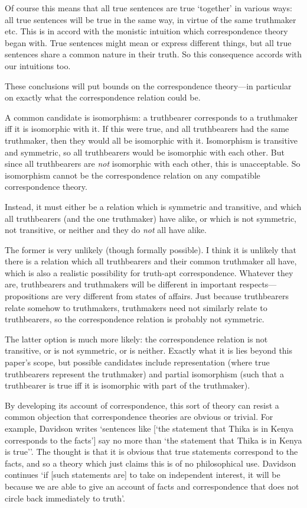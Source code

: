 Of course this means that all true sentences are true `together' in various ways: all true sentences will be true in the same way, in virtue of the same truthmaker etc.
This is in accord with the monistic intuition which correspondence theory began with.
True sentences might mean or express different things, but all true sentences share a common nature in their truth.
So this consequence accords with our intuitions too.

These conclusions will put bounds on the correspondence theory---in particular on exactly what the correspondence relation could be.

A common candidate is isomorphism: a truthbearer corresponds to a truthmaker iff it is isomorphic with it.
If this were true, and all truthbearers had the same truthmaker, then they would all be isomorphic with it.
Isomorphism is transitive and symmetric, so all truthbearers would be isomorphic with each other.
But since all truthbearers are \emph{not} isomorphic with each other, this is unacceptable.
So isomorphism cannot be the correspondence relation on any compatible correspondence theory.

Instead, it must either be a relation which is symmetric and transitive, and which all truthbearers (and the one truthmaker) have alike, or which is not symmetric, not transitive, or neither and they do \emph{not} all have alike.

The former is very unlikely (though formally possible).
I think it is unlikely that there is a relation which all truthbearers and their common truthmaker all have, which is also a realistic possibility for truth-apt correspondence.
Whatever they are, truthbearers and truthmakers will be different in important respects---propositions are very different from states of affairs.
Just because truthbearers relate somehow to truthmakers, truthmakers need not similarly relate to truthbearers, so the correspondence relation is probably not symmetric.

The latter option is much more likely: the correspondence relation is not transitive, or is not symmetric, or is neither.
Exactly what it is lies beyond this paper's scope, but possible candidates include representation (where true truthbearers represent the truthmaker) and partial isomorphism (such that a truthbearer is true iff it is isomorphic with part of the truthmaker).

By developing its account of correspondence, this sort of theory can resist a common objection that correspondence theories are obvious or trivial.
For example, Davidson writes `sentences like [`the statement that Thika is in Kenya corresponds to the facts'] say no more than `the statement that Thika is in Kenya is true''.
The thought is that it is obvious that true statements correspond to the facts, and so a theory which just claims this is of no philosophical use.
Davidson continues `if [such statements are] to take on independent interest, it will be because we are able to give an account of facts and correspondence that does not circle back immediately to truth'.
\parencite[752]{Davidson_1969} 

